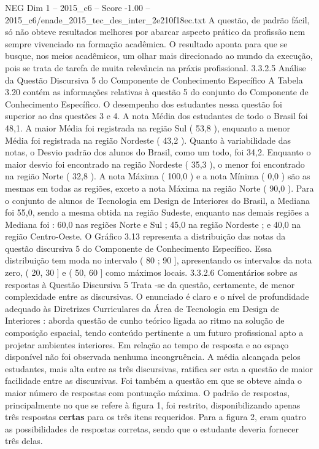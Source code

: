 \begin{textsample}{NEG Dim 1 – 2015\_c6 – Score -1.00 – 2015\_c6/enade\_2015\_tec\_des\_inter\_2e210f18ec.txt}
A questão, de padrão fácil, só não obteve resultados melhores por abarcar aspecto prático da profissão nem sempre vivenciado na formação acadêmica.
O resultado aponta para que se busque, nos meios acadêmicos, um olhar mais direcionado ao mundo da execução, pois se trata de tarefa de muita relevância na práxis profissional. 3.3.2.5 Análise da Questão Discursiva 5 do Componente de Conhecimento Específico A Tabela 3.20 contém as informações relativas à questão 5 do conjunto do Componente de Conhecimento Específico.
O desempenho dos estudantes nessa questão foi superior ao das questões 3 e 4.
A nota Média dos estudantes de todo o Brasil foi 48,1.
A maior Média foi registrada na região Sul ( 53,8 ), enquanto a menor Média foi registrada na região Nordeste ( 43,2 ).
Quanto à variabilidade das notas, o Desvio padrão dos alunos do Brasil, como um todo, foi 34,2.
Enquanto o maior desvio foi encontrado na região Nordeste ( 35,3 ), o menor foi encontrado na região Norte ( 32,8 ).
A nota Máxima ( 100,0 ) e a nota Mínima ( 0,0 ) são as mesmas em todas as regiões, exceto a nota Máxima na região Norte ( 90,0 ).
Para o conjunto de alunos de Tecnologia em Design de Interiores do Brasil, a Mediana foi 55,0, sendo a mesma obtida na região Sudeste, enquanto nas demais regiões a Mediana foi : 60,0 nas regiões Norte e Sul ; 45,0 na região Nordeste ; e 40,0 na região Centro-Oeste.
O Gráfico 3.13 representa a distribuição das notas da questão discursiva 5 do Componente de Conhecimento Específico.
Essa distribuição tem moda no intervalo ( 80 ; 90 ], apresentando os intervalos da nota zero, ( 20, 30 ] e ( 50, 60 ] como máximos locais. 3.3.2.6 Comentários sobre as respostas à Questão Discursiva 5 Trata -se da questão, certamente, de menor complexidade entre as discursivas.
O enunciado é claro e o nível de profundidade adequado às Diretrizes Curriculares da Área de Tecnologia em Design de Interiores : aborda questão de cunho teórico ligada ao ritmo na solução de composição espacial, tendo conteúdo pertinente a um futuro profissional apto a projetar ambientes interiores.
Em relação ao tempo de resposta e ao espaço disponível não foi observada nenhuma incongruência.
A média alcançada pelos estudantes, mais alta entre as três discursivas, ratifica ser esta a questão de maior facilidade entre as discursivas.
Foi também a questão em que se obteve ainda o maior número de respostas com pontuação máxima.
O padrão de respostas, principalmente no que se refere à figura 1, foi restrito, disponibilizando apenas três respostas \textbf{certas} para os três itens requeridos.
Para a figura 2, eram quatro as possibilidades de respostas corretas, sendo que o estudante deveria fornecer três delas.

\end{textsample}
